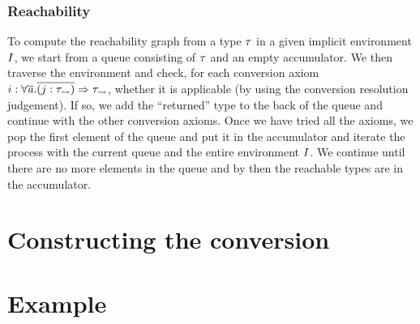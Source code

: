 \subsubsection{Reachability}
To compute the reachability graph from a type $\mathit{\tau}$ in a given implicit environment $I$, we start from a queue consisting of $\mathit{\tau}$ and an empty accumulator. We then traverse the environment and check, for each conversion axiom $i : \forall \overline {\mathit{a}} . \overline{(j : \mathit{\tau_{\rightsquigarrow}})} \Rightarrow \mathit{\tau_{\rightsquigarrow}}$, whether it is applicable (by using the conversion resolution judgement). If so, we add the ``returned'' type to the back of the queue and continue with the other conversion axioms. Once we have tried all the axioms, we pop the first element of the queue and put it in the accumulator and iterate the process with the current queue and the entire environment $I$. We continue until there are no more elements in the queue and by then the reachable types are in the accumulator.

\section{Constructing the conversion}
\label{6.4}
\section{Example}
